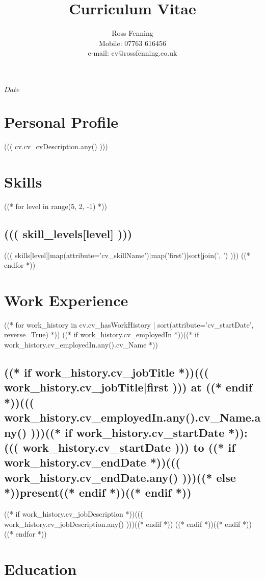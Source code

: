\documentclass[10pt]{article}
\begin{document}
\title{\bf{Curriculum Vitae}}
\author{
  Ross Fenning\\
  Mobile: 07763 616456\\
  e-mail: cv@rossfenning.co.uk
}

\SVNdate $Date$
\maketitle

\hrulefill

\section*{Personal Profile}
((( cv.cv_cvDescription.any() )))

\section*{Skills}

((* for level in range(5, 2, -1) *))
\subsection*{((( skill_levels[level] )))}

((( skills[level]|map(attribute='cv_skillName')|map('first')|sort|join(', ') )))
((* endfor *))


\section*{Work Experience}

((* for work_history in cv.cv_hasWorkHistory | sort(attribute='cv_startDate', reverse=True) *))
((* if work_history.cv_employedIn *))((* if work_history.cv_employedIn.any().cv_Name *))
\subsection*{((* if work_history.cv_jobTitle *))((( work_history.cv_jobTitle|first ))) at ((* endif *))((( work_history.cv_employedIn.any().cv_Name.any() )))((* if work_history.cv_startDate *)): ((( work_history.cv_startDate ))) to ((* if work_history.cv_endDate *))((( work_history.cv_endDate.any() )))((* else *))present((* endif *))((* endif *))}

((* if work_history.cv_jobDescription *))((( work_history.cv_jobDescription.any() )))((* endif *))
((* endif *))((* endif *))
((* endfor *))


\section*{Education}
\end{document}
